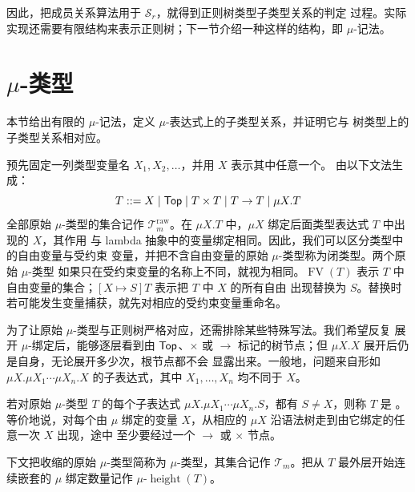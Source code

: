 
因此，把成员关系算法用于 \(\mathcal S_r\)，就得到正则树类型子类型关系的判定
过程。实际实现还需要有限结构来表示正则树；下一节介绍一种这样的结构，即
\(\mu\)-记法。

\section{\texorpdfstring{\(\mu\)-类型}{μ-类型}}
\label{sec:21.8}

本节给出有限的 \(\mu\)-记法，定义 \(\mu\)-表达式上的子类型关系，并证明它与
树类型上的子类型关系相对应。

\begin{definition}
\label{def:21.8.1}
预先固定一列类型变量名 \(X_1,X_2,\ldots\)，并用 \(X\) 表示其中任意一个。
由以下文法生成：
\[
T ::= X\mid\mathsf{Top}\mid T\times T\mid T\to T\mid\mu X.T
\]
全部原始 \(\mu\)-类型的集合记作 \(\mathcal T_m^{\mathrm{raw}}\)。在
\(\mu X.T\) 中，\(\mu X\) 绑定后面类型表达式 \(T\) 中出现的 \(X\)，其作用
与 lambda 抽象中的变量绑定相同。因此，我们可以区分类型中的自由变量与受约束
变量，并把不含自由变量的原始 \(\mu\)-类型称为闭类型。两个原始 \(\mu\)-类型
如果只在受约束变量的名称上不同，就视为相同。\(\operatorname{FV}(T)\) 表示
\(T\) 中自由变量的集合；\([X\mapsto S]T\) 表示把 \(T\) 中 \(X\) 的所有自由
出现替换为 \(S\)。替换时若可能发生变量捕获，就先对相应的受约束变量重命名。
\end{definition}

为了让原始 \(\mu\)-类型与正则树严格对应，还需排除某些特殊写法。我们希望反复
展开 \(\mu\)-绑定后，能够逐层看到由 \(\mathsf{Top}\)、\(\times\) 或 \(\to\)
标记的树节点；但 \(\mu X.X\) 展开后仍是自身，无论展开多少次，根节点都不会
显露出来。一般地，问题来自形如
\(\mu X.\mu X_1\cdots\mu X_n.X\) 的子表达式，其中
\(X_1,\ldots,X_n\) 均不同于 \(X\)。

\begin{definition}
\label{def:21.8.2}
若对原始 \(\mu\)-类型 \(T\) 的每个子表达式
\(\mu X.\mu X_1\cdots\mu X_n.S\)，都有 \(S\ne X\)，则称 \(T\) 是
。等价地说，对每个由 \(\mu\) 绑定的变量
\(X\)，从相应的 \(\mu X\) 沿语法树走到由它绑定的任意一次 \(X\) 出现，途中
至少要经过一个 \(\to\) 或 \(\times\) 节点。

下文把收缩的原始 \(\mu\)-类型简称为 \(\mu\)-类型，其集合记作
\(\mathcal T_m\)。把从 \(T\) 最外层开始连续嵌套的 \(\mu\) 绑定数量记作
\(\mu\text{-}\operatorname{height}(T)\)。
\end{definition}

